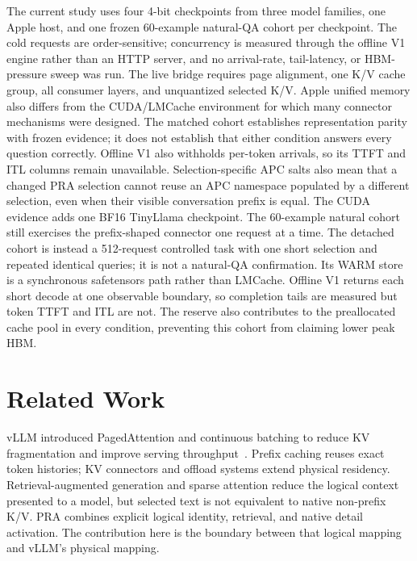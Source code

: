 \documentclass[10pt]{article}
\begin{document}
The current study uses four 4-bit checkpoints from three model families, one
Apple host, and one frozen 60-example natural-QA cohort per checkpoint. The cold requests are
order-sensitive; concurrency is
measured through the offline V1 engine rather than an HTTP server, and no
arrival-rate, tail-latency, or HBM-pressure sweep was run. The live bridge
requires page alignment, one K/V cache group, all consumer layers, and
unquantized selected K/V. Apple unified memory also differs
from the CUDA/LMCache environment for which many connector mechanisms were
designed. The matched cohort establishes representation parity with frozen
evidence; it does not establish that either condition answers every question
correctly. Offline V1 also withholds per-token arrivals, so its
TTFT and ITL columns remain unavailable. Selection-specific APC salts also
mean that a changed PRA selection cannot reuse an APC namespace populated by a
different selection, even when their visible conversation prefix is equal.
The CUDA evidence adds one BF16 TinyLlama checkpoint. The 60-example natural
cohort still exercises the prefix-shaped connector one request at a time. The
detached cohort is instead a 512-request controlled task with one short
selection and repeated identical queries; it is not a natural-QA confirmation.
Its WARM store is a synchronous safetensors path rather than LMCache. Offline
V1 returns each short decode at one observable boundary, so completion tails
are measured but token TTFT and ITL are not. The reserve also contributes to
the preallocated cache pool in every condition, preventing this cohort from
claiming lower peak HBM.

\section{Related Work}
vLLM introduced PagedAttention and continuous batching to reduce KV
fragmentation and improve serving throughput~\cite{kwon2023vllm}. Prefix
caching reuses exact token histories; KV connectors and offload systems extend
physical residency. Retrieval-augmented generation and sparse attention reduce
the logical context presented to a model, but selected text is not equivalent
to native non-prefix K/V. PRA combines explicit logical identity, retrieval,
and native detail activation. The contribution here is the boundary between
that logical mapping and vLLM's physical mapping.
\end{document}
